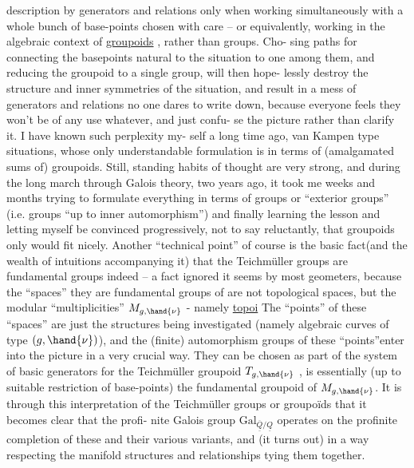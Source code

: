 description by generators and relations only when working simultaneously
with a whole bunch of base-points chosen with care -- or equivalently,
working in the algebraic context of \uline{groupoids} , rather than groups. Cho-%
sing paths for connecting the basepoints natural to the situation to  one
among them, and reducing the groupoid to a single group, will then hope-%
lessly destroy the structure and inner symmetries of the situation, and
result in a mess of generators and relations no one dares to write down,
because everyone feels they won't be of any use whatever, and just confu-%
se the picture rather than clarify it. I have known such perplexity my-%
self a long time ago,   van Kampen type situations, whose
only understandable formulation is in terms of (amalgamated sums of)
groupoids. Still, standing habits of thought are very strong, and
during the long march through Galois theory, two years ago, it took me
weeks and months trying to formulate everything in terms of groups or
``exterior groups'' (i.e. groups ``up to inner automorphism'')\hand{,} and finally
 learning the lesson
and letting myself be convinced progressively, not to say reluctantly,
that  groupoids only would fit nicely. Another ``technical point'' of
course is the basic fact(and the wealth of intuitions accompanying it)
that the Teichmüller groups are  fundamental groups indeed -- a
fact ignored it seems by most geometers, because the  ``spaces'' they are
fundamental groups of are not topological spaces, but 
the modular ``multiplicities'' $M_{g,\hand{\nu}}$ - namely \uline{topoi}\hand{!} The ``points'' of these
``spaces'' are just the structures being investigated (namely algebraic
curves of type $(g,\hand{\nu})$), and the (finite) automorphism groups of these
``points''enter into the picture in a very crucial way. They can be  chosen
as part of the system of basic generators for the Teichmüller groupoid
$T_{g,\hand{\nu}}$ ,   is essentially (up to suitable restriction of base-points)
 the fundamental groupoid of $M_{g,\hand{\nu}}$. It is through this interpretation of
the Teichmüller groups or groupoïds that it becomes clear that the profi-%
nite Galois group $\mathrm{Gal}_{\overline{\underline{Q}}/\underline{Q}}$ operates on the profinite completion of these
and  their various variants, and  (it turns out) in a way respecting the
manifold structures and relationships tying them  together.

